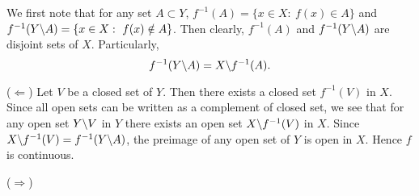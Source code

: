 
\begin{solution}
    We first note that for any set $A\subset Y$,
    $f^{-1}(A)=\{x\in X:\ f(x)\in A\}$ and
    $f^{-1}(Y\char`\\A)=\{x\in X:\ f(x) \notin A\}$.
    Then clearly, $f^{-1}(A)$ and $f^{-1}(Y\char`\\A)$
    are disjoint sets of $X$. Particularly,
    $$f^{-1}(Y\char`\\A)=X\char`\\f^{-1}(A).$$

    \vspace*{3mm}
    ($\Longleftarrow$)
    Let $V$ be a closed set of $Y$. Then there exists
    a closed set $f^{-1}(V)$ in  $X$. Since all open
    sets can be written as a complement of closed set,
    we see that for any open set $Y\char`\\V$ in $Y$
    there exists an open set $X\char`\\f^{-1}(V)$ in
    $X$. Since $X\char`\\f^{-1}(V)=f^{-1}(Y\char`\\A)$,
    the preimage of any open set of $Y$ is open in
    $X$. Hence $f$ is continuous.

    \vspace*{3mm}
    ($\Longrightarrow$)
\end{solution}